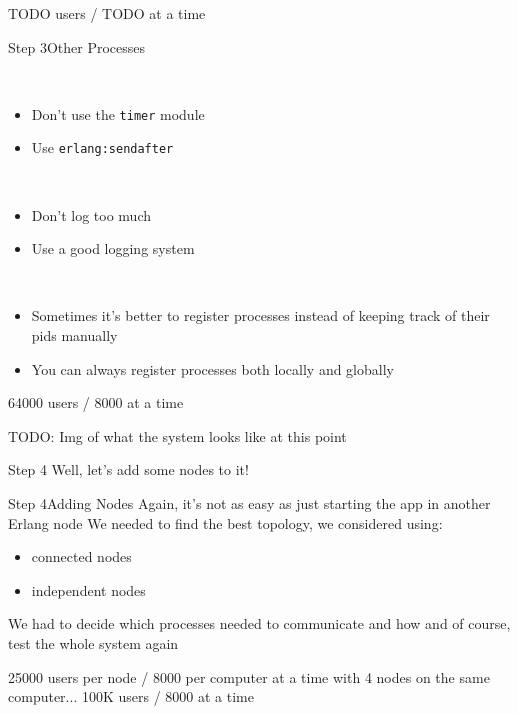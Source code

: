 \documentclass[utf8]{beamer}
\begin{document}
\begin{frame}
TODO users / TODO at a time
\end{frame}

\begin{frame}{Step 3}{Other Processes}
	\begin{description}
		\item<+->[Timers]\ \\
			\begin{itemize}
				\item Don't use the \texttt{timer} module
				\item Use \texttt{erlang:send\textunderscore after}
			\end{itemize}
		\item<+->[Logging]\ \\
			\begin{itemize}
				\item Don't log too much
				\item Use a good logging system
			\end{itemize}
		\item<+->[Registration]\ \\
			\begin{itemize}
				\item Sometimes it's better to register processes instead of keeping track of their pids manually
				\item You can always register processes \alert{both} locally and globally
			\end{itemize}
	\end{description}
\end{frame}

\begin{frame}
64000 users / 8000 at a time
\end{frame}

\begin{frame}
TODO: Img of what the system looks like at this point
\end{frame}

\begin{frame}{Step 4}
Well, let's add some nodes to it!
\end{frame}

\begin{frame}{Step 4}{Adding Nodes}
Again, it's not as easy as just starting the app in another Erlang node
\pause
We needed to find the best topology, we considered using:
	\begin{itemize}
		\item connected nodes
		\item independent nodes
	\end{itemize}
\pause
We had to decide which processes needed to communicate and how
\pause
and of course, test the whole system again
\end{frame}

\begin{frame}
25000 users per node / 8000 per computer at a time
\pause
with 4 nodes on the same computer...
\pause
100K users / 8000 at a time
\end{frame}
\end{document}
